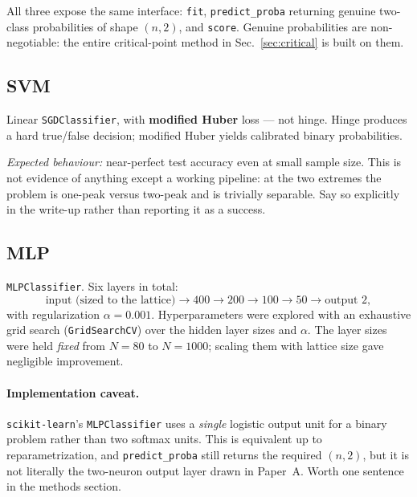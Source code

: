 \documentclass[11pt]{article}
\begin{document}
All three expose the same interface: \texttt{fit}, \texttt{predict\_proba}
returning genuine two-class probabilities of shape $(n,2)$, and
\texttt{score}. Genuine probabilities are non-negotiable: the entire
critical-point method in Sec.~\ref{sec:critical} is built on them.

\subsection{SVM}
Linear \texttt{SGDClassifier}, with \textbf{modified Huber} loss --- not
hinge. Hinge produces a hard true/false decision; modified Huber yields
calibrated binary probabilities.

\noindent
\emph{Expected behaviour:} near-perfect test accuracy even at small sample
size. This is not evidence of anything except a working pipeline: at the two
extremes the problem is one-peak versus two-peak and is trivially separable.
Say so explicitly in the write-up rather than reporting it as a success.

\subsection{MLP}
\texttt{MLPClassifier}. Six layers in total:
\begin{equation*}
\text{input (sized to the lattice)} \rightarrow 400 \rightarrow 200
\rightarrow 100 \rightarrow 50 \rightarrow \text{output } 2 ,
\end{equation*}
with regularization $\alpha = 0.001$. Hyperparameters were explored with an
exhaustive grid search (\texttt{GridSearchCV}) over the hidden layer sizes
and $\alpha$. The layer sizes were held \emph{fixed} from $N=80$ to $N=1000$;
scaling them with lattice size gave negligible improvement.

\paragraph{Implementation caveat.} \texttt{scikit-learn}'s
\texttt{MLPClassifier} uses a \emph{single} logistic output unit for a binary
problem rather than two softmax units. This is equivalent up to
reparametrization, and \texttt{predict\_proba} still returns the required
$(n,2)$, but it is not literally the two-neuron output layer drawn in
Paper~A. Worth one sentence in the methods section.

\end{document}
